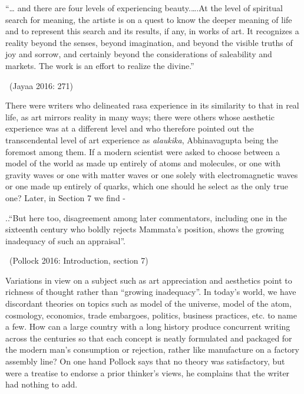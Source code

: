 \begin{myquote}
“… and there are four levels of experiencing beauty.….At the level of spiritual search for meaning, the artiste is on a quest to know the deeper meaning of life and to represent this search and its results, if any, in works of art. It recognizes a reality beyond the senses, beyond imagination, and beyond the visible truths of joy and sorrow, and certainly beyond the considerations of saleability and markets. The work is an effort to realize the divine.” 

~\hfill (Jayaa 2016: 271)
\end{myquote}

There were writers who delineated rasa experience in its similarity to that in real life, as art mirrors reality in many ways; there were others whose aesthetic experience was at a different level and who therefore pointed out the transcendental level of art experience as \textit{alaukika}, Abhinavagupta being the foremost among them. If a modern scientist were asked to choose between a model of the world as made up entirely of atoms and molecules, or one with gravity waves or one with matter waves or one solely with electromagnetic waves or one made up entirely of quarks, which one should he select as the only true one? Later, in Section 7 we find -

\newpage

\begin{myquote}
..``But here too, disagreement among later commentators, including one in the sixteenth century who boldly rejects Mammata’s position, shows the growing inadequacy of such an appraisal”. 

~\hfill (Pollock 2016: Introduction, section 7)
\end{myquote}

Variations in view on a subject such as art appreciation and aesthetics point to richness of thought rather than “growing inadequacy”. In today’s world, we have discordant theories on topics such as model of the universe, model of the atom, cosmology, economics, trade embargoes, politics, business practices, etc. to name a few. How can a large country with a long history produce concurrent writing across the centuries so that each concept is neatly formulated and packaged for the modern man’s consumption or rejection, rather like manufacture on a factory assembly line? On one hand Pollock says that no theory was satisfactory, but were a treatise to endorse a prior thinker’s views, he complains that the writer had nothing to add.


